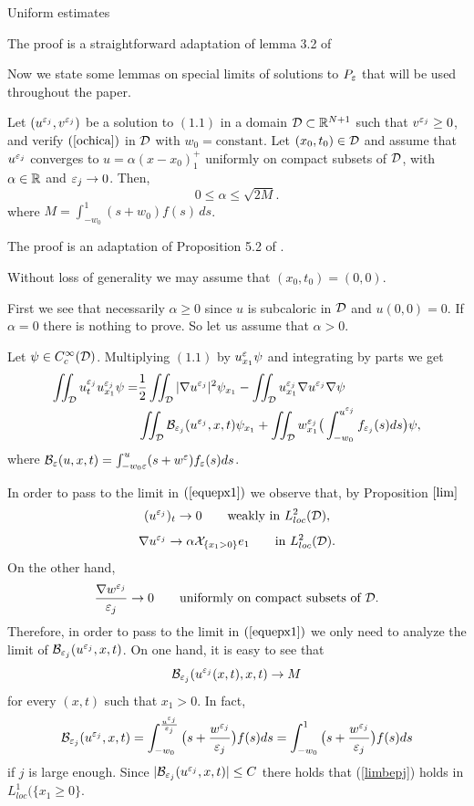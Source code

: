 \begin{section}{Uniform estimates}
\begin{pf}
The proof is a straightforward adaptation of lemma 3.2 of \cite{CLW1}
\end{pf}

Now we state some lemmas on special limits of solutions to $P_{\varepsilon}$ that
will be used throughout the paper.

\begin{lema}
\label{global1}
Let $(u^{\varepsilon_j},v^{\varepsilon_j})$ be a solution to $(1.1)$ in a domain ${\cal D}\subset{\Bbb R}^{N+1}$
such that $v^{\varepsilon_j}\ge0$,  and verify $(\ref{ochica})$ in ${\cal D}$ with
$w_0=\mbox{constant}$. 
Let $(x_0,t_0)\in{\cal D}$ and assume that $u^{\varepsilon_j}$ converges
to $u=\alpha(x-x_0)_1^+$ uniformly on compact subsets of ${\cal D}$, with $\alpha\in{\Bbb R}$
and ${\varepsilon_j}\to0$. Then,
\begin{equation}
0\le\alpha\le\sqrt{2M}.
\end{equation}
where $M=\int_{-w_0}^1 (s+w_0)f(s)\,ds$.
\end{lema}

\begin{pf}
The proof is an adaptation of Proposition 5.2 of \cite{CLW1}.

Without loss of generality we may assume that $(x_0,t_0)=(0,0)$.

First we see that necessarily $\alpha\ge0$ since $u$ is subcaloric in ${\cal D}$
and $u(0,0)=0$. If  $\alpha=0$ there is nothing to prove. So let us assume
that $\alpha>0$. 

Let $\psi\in C_c^\infty({\cal D})$. Multiplying $(1.1)$ by $u^\varepsilon_{x_1}\psi$
and integrating by parts we get
\begin{equation}
\begin{aligned}
\label{equepx1}
\iint_{{\cal D}}u^{\varepsilon_j}_tu^{\varepsilon_j}_{x_1}\psi=&\frac12\iint_{{\cal D}}|\nabla u^{\varepsilon_j}|^2\psi_{x_1}
-\iint_{{\cal D}}u^{\varepsilon_j}_{x_1}\nabla u^{\varepsilon_j}\nabla\psi\\
&\iint_{{\cal D}}{\cal B}_{{\varepsilon_j}}(u^{\varepsilon_j},x,t)\psi_{x_1}
+\iint_{{\cal D}}w^{\varepsilon_j}_{x_1}\big(\int_{-w_0}^{u^{\varepsilon_j}}f_{{\varepsilon_j}}(s)ds\big)\psi,
\end{aligned}
\end{equation}
where ${\cal B}_\varepsilon(u,x,t)=\int_{-w_0\varepsilon}^u(s+w^\varepsilon)f_\varepsilon(s)ds$.

In order to pass to the limit in $(\ref{equepx1})$ we observe that, by Proposition
$\ref{lim}$
$$
(u^{\varepsilon_j})_t\to 0\qquad\mbox{weakly in }L^2_{loc}({\cal D}),
$$
$$
\nabla u^{\varepsilon_j}\to\alpha{\cal X}_{\{x_1>0\}} e_1\qquad\mbox{in }L^2_{loc}({\cal D}).
$$
On the other hand,
$$
\frac{\nabla w^{\varepsilon_j}}{{\varepsilon_j}} \to 0\qquad\mbox{uniformly on compact subsets of }{\cal D}.
$$
Therefore, in order to pass to the limit in $(\ref{equepx1})$ we only need
to analyze the limit of ${\cal B}_{{\varepsilon_j}}(u^{\varepsilon_j},x,t)$. On one hand, it is easy to see
that
\begin{equation}
\label{limbepj}
{\cal B}_{{\varepsilon_j}}(u^{\varepsilon_j}(x,t),x,t)\to M
\end{equation}
for every $(x,t)$ such that $x_1>0$. In fact,
$$
{\cal B}_{{\varepsilon_j}}(u^{\varepsilon_j},x,t)=\int_{-w_0}^{\frac{u^{\varepsilon_j}}{{\varepsilon_j}}}\big(s+\frac{w^{\varepsilon_j}}{{\varepsilon_j}}\big)
f(s)ds=
\int_{-w_0}^1\big(s+\frac{w^{\varepsilon_j}}{{\varepsilon_j}}\big)f(s)ds
$$
if $j$ is large enough. Since $|{\cal B}_{{\varepsilon_j}}(u^{\varepsilon_j},x,t)|\le C$ there holds that
(\ref{limbepj}) holds in $L^1_{loc}(\{x_1\ge0\}$.


\end{pf}
\end{section}
